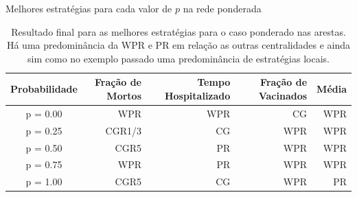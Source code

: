 \begin{table}[H]
    \captionsetup{width=13.5cm}
    \caption{Melhores estratégias para cada valor de $p$ na rede ponderada}
    \begin{tabular}{crrrr}
    \toprule
    Probabilidade & Fração de Mortos & Tempo Hospitalizado & Fração de Vacinados & Média \\
    \midrule
    \midrule
    p = 0.00       & WPR & WPR & CG & WPR\\
    p = 0.25      & CGR1/3 & CG & WPR & WPR\\
    p = 0.50      & CGR5 & PR & WPR & WPR\\
    p = 0.75      & WPR & PR & WPR &  WPR\\
    p = 1.00      & CGR5 & CG & WPR &  PR\\    
    \bottomrule
\end{tabular}
\caption*{Resultado final para as melhores estratégias para o caso ponderado nas arestas. Há uma predominância da WPR e PR em relação as outras centralidades e ainda sim como no exemplo passado uma predominância de estratégias locais.}
\label{tabela:melhoresponderado}
\end{table}

